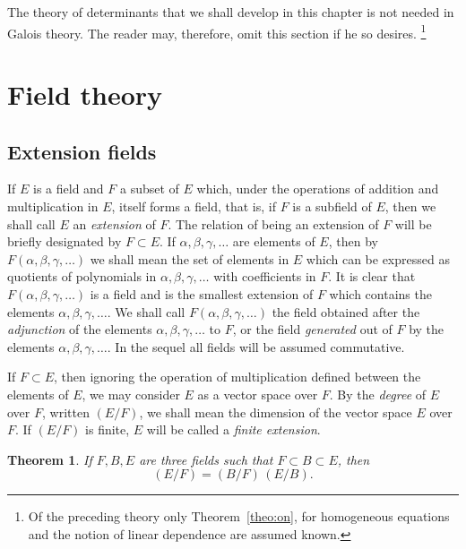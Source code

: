 \documentclass[11pt]{article}
\newtheorem{theo}{Theorem}
\theoremstyle{definition}
\begin{document}
The theory of determinants that we shall develop in this chapter is not need\-ed in Galois theory.
The reader may, therefore, omit this section if he so desires.%
\footnote{Of the preceding theory only Theorem~\ref{theo:on}, for homogeneous equations and the notion of linear dependence are assumed known.}




\section{Field theory}


\subsection{Extension fields}

If $E$ is a field and $F$ a subset of $E$ which, under the operations of addition and multiplication in $E$, itself forms a field, that is, if $F$ is a subfield of $E$, then we shall call $E$ an \emph{extension} of $F$.
The relation of being an extension of $F$ will be briefly designated by $F \subset E$.
If $\alpha, \beta, \gamma, \ldots$ are elements of $E$, then by $F(\alpha, \beta, \gamma, \ldots)$ we shall mean the set of elements in $E$ which can be expressed as quotients of polynomials in $\alpha, \beta, \gamma, \ldots$ with coefficients in $F$.
It is clear that $F(\alpha, \beta, \gamma, \ldots)$ is a field and is the smallest extension of $F$ which contains the elements $\alpha, \beta, \gamma, \ldots$.
We shall call $F(\alpha, \beta, \gamma, \ldots)$ the field obtained after the \emph{adjunction} of the elements $\alpha, \beta, \gamma, \ldots$ to $F$, or the field \emph{generated} out of $F$ by the elements $\alpha, \beta, \gamma, \ldots$.
In the sequel all fields will be assumed commutative.

If $F \subset E$, then ignoring the operation of multiplication defined between the elements of $E$, we may consider $E$ as a vector space over $F$.
By the \emph{degree} of $E$ over $F$, written $(E/F)$, we shall mean the dimension of the vector space $E$ over $F$.
If $(E/F)$ is finite, $E$ will be called a \emph{finite extension}.


\begin{theo}
\label{theo:si}
If $F, B, E$ are three fields such that $F \subset B \subset E$, then
\[
(E/F) = (B/F) \, (E/B).
\]
\end{theo}
\end{document}
